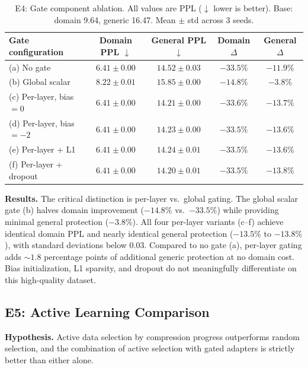 \documentclass{article}
\begin{document}
\begin{table}[h]
\centering
\caption{E4: Gate component ablation. All values are PPL
($\downarrow$ lower is better). Base: domain 9.64, generic 16.47.
Mean $\pm$ std across 3 seeds.}
\label{tab:e4}
\begin{tabular}{@{}lcccc@{}}
\toprule
Gate configuration & Domain PPL $\downarrow$ & General PPL $\downarrow$ & Domain $\Delta$ & General $\Delta$ \\
\midrule
(a) No gate              & $6.41{\pm}0.00$ & $14.52{\pm}0.03$ & $-33.5\%$ & $-11.9\%$ \\
(b) Global scalar        & $8.22{\pm}0.01$ & $15.85{\pm}0.00$ & $-14.8\%$ & $-3.8\%$ \\
(c) Per-layer, bias$=0$  & $6.41{\pm}0.00$ & $14.21{\pm}0.00$ & $-33.6\%$ & $-13.7\%$ \\
(d) Per-layer, bias$=-2$ & $6.41{\pm}0.00$ & $14.23{\pm}0.00$ & $-33.5\%$ & $-13.6\%$ \\
(e) Per-layer + L1       & $6.41{\pm}0.00$ & $14.24{\pm}0.01$ & $-33.5\%$ & $-13.6\%$ \\
(f) Per-layer + dropout  & $6.41{\pm}0.00$ & $14.20{\pm}0.01$ & $-33.5\%$ & $-13.8\%$ \\
\bottomrule
\end{tabular}
\end{table}

\textbf{Results.} The critical distinction is per-layer vs.\ global gating.
The global scalar gate (b) halves domain improvement ($-14.8\%$ vs.\
$-33.5\%$) while providing minimal general protection ($-3.8\%$).
All four per-layer variants (c--f) achieve identical domain PPL and
nearly identical general protection ($-13.5\%$ to $-13.8\%$), with
standard deviations below $0.03$.  Compared to no gate (a), per-layer
gating adds ${\sim}1.8$ percentage points of additional generic
protection at no domain cost.  Bias initialization, L1 sparsity, and
dropout do not meaningfully differentiate on this high-quality dataset.

\subsection{E5: Active Learning Comparison}
\label{sec:e5}

\textbf{Hypothesis.} Active data selection by compression progress
outperforms random selection, and the combination of active selection
with gated adapters is strictly better than either alone.
\end{document}
